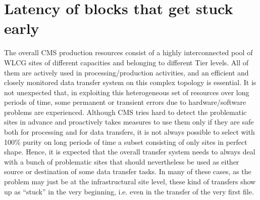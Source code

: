 \section{Latency of blocks that get stuck early}
\label{sec:earlystuck}

The overall CMS production resources consist of a highly
interconnected pool of WLCG sites of different capacities and
belonging to different Tier levels. All of them are actively used in
processing/production activities, and an efficient and closely
monitored data transfer system on this complex topology is
essential. It is not unexpected that, in exploiting this heterogeneous
set of resources over long periods of time, some permanent or
transient errors due to hardware/software problems are
experienced. Although CMS tries hard to detect the problematic sites
in advance and proactively takes measures to use them only if they are
safe both for processing and for data transfers, it is not always
possible to select with 100\% purity on long periods of time a subset
consisting of only sites in perfect shape. Hence, it is expected that
the overall transfer system needs to always deal with a bunch of
problematic sites that should nevertheless be used as either source or
destination of some data transfer tasks. In many of these cases, as
the problem may just be at the infrastructural site level, these kind
of transfers show up as “stuck” in the very beginning, i.e. even in
the transfer of the very first file.

